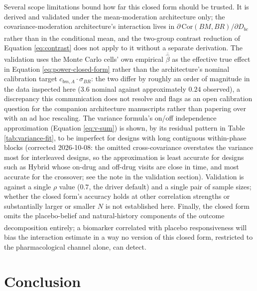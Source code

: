 \documentclass[
  11pt,
]{article}
\begin{document}
Several scope limitations bound how far this closed form should be
trusted. It is derived and validated under the mean-moderation
architecture only; the covariance-moderation architecture's
interaction lives in \(\partial\,\mathrm{Cor}(BM,BR)/\partial D_{bc}\)
rather than in the conditional mean\textsuperscript{}, and the
two-group contrast reduction of Equation \eqref{eq:contrast} does not
apply to it without a separate derivation. The validation uses the
Monte Carlo cells' own empirical \(\overline{\hat\beta}\) as the
effective true effect in Equation \eqref{eq:power-closed-form} rather
than the architecture's nominal calibration target
\(c_{bm,A}\cdot\sigma_{BR}\): the two differ by roughly an order of
magnitude in the data inspected here (\(3.6\) nominal against
approximately \(0.24\) observed), a discrepancy
this communication
does not resolve and flags as an open calibration question for the
companion architecture manuscripts rather than papering over with an
ad hoc rescaling. The variance formula's on/off independence
approximation (Equation \eqref{eq:v-sum}) is shown, by its residual
pattern in Table \ref{tab:variance-fit}, to be imperfect for designs
with long contiguous within-phase blocks (corrected 2026-10-08: the
omitted cross-covariance overstates the variance most for interleaved
designs, so the approximation is least accurate for designs such as
Hybrid whose on-drug and off-drug visits are close in time, and most
accurate for the crossover; see the note in the validation section).
Validation is against a
single \(\rho\) value (\(0.7\), the driver default) and a single pair of
sample sizes; whether the closed form's accuracy holds at other
correlation strengths or substantially larger or smaller \(N\) is not
established here. Finally, the closed form omits the placebo-belief
and natural-history components of the outcome decomposition
entirely\textsuperscript{}; a biomarker correlated with placebo
responsiveness will bias the interaction estimate in a way no version
of this closed form, restricted to the pharmacological channel alone,
can detect.

\section{Conclusion}\label{conclusion}
\end{document}
